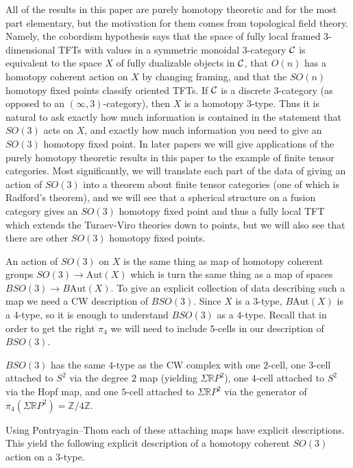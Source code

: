 \documentclass{amsart}
\begin{document}
All of the results in this paper are purely homotopy theoretic and for the most part elementary, but the motivation for them comes from topological field theory.  Namely, the cobordism hypothesis says that the space of fully local framed $3$-dimensional TFTs with values in a symmetric monoidal $3$-category $\mathcal C$ is equivalent to the space $X$ of fully dualizable objects in $\mathcal C$, that $O(n)$ has a homotopy coherent action on $X$ by changing framing, and that the $SO(n)$ homotopy fixed points classify oriented TFTs.  If $\mathcal C$ is a discrete $3$-category (as opposed to an $(\infty,3)$-category), then $X$ is a homotopy $3$-type.  Thus it is natural to ask exactly how much information is contained in the statement that $SO(3)$ acts on $X$, and exactly how much information you need to give an $SO(3)$ homotopy fixed point.  In later papers we will give applications of the purely homotopy theoretic results in this paper to the example of finite tensor categories.  Most significantly, we will translate each part of the data of giving an action of $SO(3)$ into a theorem about finite tensor categories (one of which is Radford's theorem), and we will see that a spherical structure on a fusion category gives an $SO(3)$ homotopy fixed point and thus a fully local TFT which extends the Turaev-Viro theories down to points, but we will also see that there are other $SO(3)$ homotopy fixed points.

An action of $SO(3)$ on $X$ is the same thing as map of homotopy coherent groups $SO(3) \rightarrow \mathrm{Aut}(X)$ which is turn the same thing as a map of spaces $BSO(3) \rightarrow B\mathrm{Aut}(X)$.  To give an explicit collection of data describing such a map we need a CW description of $BSO(3)$.  Since $X$ is a $3$-type, $B\mathrm{Aut}(X)$ is a $4$-type, so it is enough to understand $BSO(3)$ as a $4$-type.  Recall that in order to get the right $\pi_4$ we will need to include $5$-cells in our description of $BSO(3)$.

\begin{theorem}
$BSO(3)$ has the same $4$-type as the CW complex with one $2$-cell, one $3$-cell attached to $S^2$ via the degree $2$ map (yielding $\Sigma \mathbb{R}P^2$), one $4$-cell attached to $S^2$ via the Hopf map, and one $5$-cell attached to $\Sigma \mathbb{R}P^2$ via the generator of $\pi_4(\Sigma \mathbb{R}P^2) = \mathbb{Z}/4\mathbb{Z}$.
\end{theorem}

Using Pontryagin--Thom each of these attaching maps have explicit descriptions.  This yield the following explicit description of a homotopy coherent $SO(3)$ action on a $3$-type.
\end{document}
